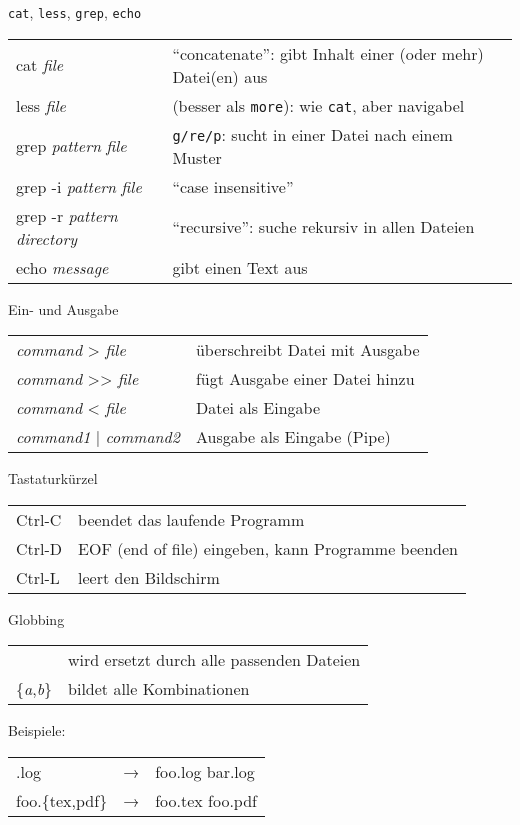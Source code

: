 \begin{frame}{\texttt{cat}, \texttt{less}, \texttt{grep}, \texttt{echo}}
  \begin{tabu}{>{\ttfamily}l X}
    cat \textit{file}                           & \enquote{concatenate}: gibt Inhalt einer (oder mehr) Datei(en) aus \\
    less \textit{file}                          & (besser als \texttt{more}): wie \texttt{cat}, aber navigabel \\
    grep \textit{pattern} \textit{file}         & \texttt{g/re/p}: sucht in einer Datei nach einem Muster \\
    grep -i \textit{pattern} \textit{file}      & \enquote{case insensitive} \\
    grep -r \textit{pattern} \textit{directory} & \enquote{recursive}: suche rekursiv in allen Dateien \\
    echo \textit{message}                       & gibt einen Text aus
  \end{tabu}
\end{frame}

\begin{frame}{Ein- und Ausgabe}
  \begin{tabu}{>{\ttfamily}l X}
    \textit{command} > \textit{file}      & überschreibt Datei mit Ausgabe \\
    \textit{command} >> \textit{file}     & fügt Ausgabe einer Datei hinzu \\
    \textit{command} < \textit{file}      & Datei als Eingabe \\
    \textit{command1} | \textit{command2} & Ausgabe als Eingabe (Pipe)
  \end{tabu}
\end{frame}

\begin{frame}{Tastaturkürzel}
  \begin{tabu}{>{\ttfamily}l X}
    Ctrl-C & beendet das laufende Programm \\
    Ctrl-D & EOF (end of file) eingeben, kann Programme beenden \\
    Ctrl-L & leert den Bildschirm
  \end{tabu}
\end{frame}

\begin{frame}{Globbing}
  \begin{tabu}{>{\ttfamily}l X}
    *                         & wird ersetzt durch alle passenden Dateien \\
    \{\textit{a},\textit{b}\} & bildet alle Kombinationen
  \end{tabu}

  \vspace{2cm}
  Beispiele:\\[10pt]
  \begin{tabu}{>{\ttfamily}l c >{\ttfamily}l}
    *.log           & → & foo.log bar.log \\
    foo.\{tex,pdf\} & → & foo.tex foo.pdf
  \end{tabu}
\end{frame}

